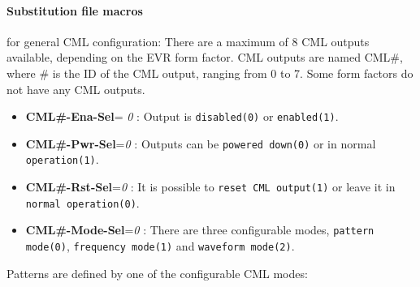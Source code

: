\documentclass[12pt,a4paper]{article}
\begin{document}
\paragraph{Substitution file macros} for general CML configuration:
There are a maximum of 8 CML outputs available, depending on the EVR form factor. CML outputs are named CML\#, where \# is the ID of the CML output, ranging from 0 to 7. Some form factors do not have any CML outputs.
\begin{itemize}
\item
  \textbf{CML\#-Ena-Sel}= \emph{0} : Output is \texttt{disabled(0)} or \texttt{enabled(1)}.
\item
  \textbf{CML\#-Pwr-Sel}=\emph{0} : Outputs can be \texttt{powered down(0)} or in normal \texttt{operation(1)}.
\item
  \textbf{CML\#-Rst-Sel}=\emph{0} : It is possible to \texttt{reset CML output(1)} or leave it in \texttt{normal operation(0)}.
\item
  \textbf{CML\#-Mode-Sel}=\emph{0} : There are three configurable modes, \texttt{pattern mode(0)}, \texttt{frequency mode(1)} and \texttt{waveform mode(2)}.
\end{itemize}
Patterns are defined by one of the configurable CML modes:
\end{document}
